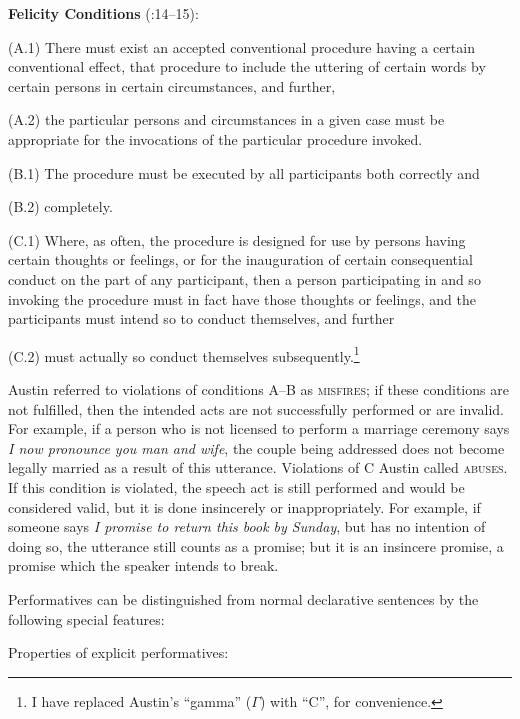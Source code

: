   \textbf{Felicity Conditions} (\citealt{Austin1962}:14–15):
\z

(A.1) There must exist an accepted conventional procedure having a certain conventional effect, that procedure to include the uttering of certain words by certain persons in certain circumstances, and further,

(A.2) the particular persons and circumstances in a given case must be appropriate for the invocations of the particular procedure invoked.

(B.1) The procedure must be executed by all participants both correctly and

(B.2) completely.

(C.1) Where, as often, the procedure is designed for use by persons having certain thoughts or feelings, or for the inauguration of certain consequential conduct on the part of any participant, then a person participating in and so invoking the procedure must in fact have those thoughts or feelings, and the participants must intend so to conduct themselves, and further

(C.2) must actually so conduct themselves subsequently.\footnote{I have replaced Austin’s “gamma” ($\Gamma $) with “C”, for convenience.}

Austin referred to violations of conditions A–B as \textsc{misfires}; if these conditions are not fulfilled, then the intended acts are not successfully performed or are invalid. For example, if a person who is not licensed to perform a marriage ceremony says \textit{I now pronounce you man and wife}, the couple being addressed does not become legally married as a result of this utterance. Violations of C Austin called \textsc{abuses}. If this condition is violated, the speech act is still performed and would be considered valid, but it is done insincerely or inappropriately. For example, if someone says \textit{I promise to return this book by Sunday}, but has no intention of doing so, the utterance still counts as a promise; but it is an insincere promise, a promise which the speaker intends to break.


Performatives can be distinguished from normal declarative sentences by the following special features:


\ea
Properties of explicit performatives:
\z

